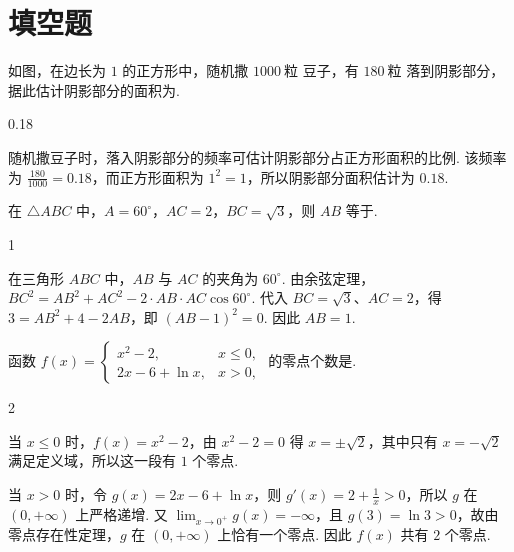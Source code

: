 \section{填空题}

\begin{problem}
如图，在边长为 \(1\) 的正方形中，随机撒 \(1000\ \text{粒}\) 豆子，有 \(180\ \text{粒}\) 落到阴影部分，据此估计阴影部分的面积为\fillinblank{}.


\begin{answer}
0.18
\end{answer}

\begin{solution}
随机撒豆子时，落入阴影部分的频率可估计阴影部分占正方形面积的比例. 该频率为 \(\frac{180}{1000}=0.18\)，而正方形面积为 \(1^2=1\)，所以阴影部分面积估计为 \(0.18\).
\end{solution}
\end{problem}

\begin{problem}
在 \(\triangle ABC\) 中，\(A = 60^\circ\)，\(AC = 2\)，\(BC = \sqrt{3}\)，则 \(AB\) 等于\fillinblank{}.

\begin{answer}
1
\end{answer}

\begin{solution}
在三角形 \(ABC\) 中，\(AB\) 与 \(AC\) 的夹角为 \(60^\circ\). 由余弦定理，\(BC^2=AB^2+AC^2-2\cdot AB\cdot AC\cos60^\circ\). 代入 \(BC=\sqrt3\)、\(AC=2\)，得 \(3=AB^2+4-2AB\)，即 \((AB-1)^2=0\). 因此 \(AB=1\).
\end{solution}
\end{problem}

\begin{problem}
函数 \(f(x) = \begin{cases}
x^2 - 2, & x \leqslant 0,\\
2x - 6 + \ln x, & x > 0,
\end{cases}\) 的零点个数是\fillinblank{}.

\begin{answer}
2
\end{answer}

\begin{solution}
当 \(x\leqslant0\) 时，\(f(x)=x^2-2\)，由 \(x^2-2=0\) 得 \(x=\pm\sqrt2\)，其中只有 \(x=-\sqrt2\) 满足定义域，所以这一段有 \(1\) 个零点.

当 \(x>0\) 时，令 \(g(x)=2x-6+\ln x\)，则 \(g'(x)=2+\frac1x>0\)，所以 \(g\) 在 \((0,+\infty)\) 上严格递增. 又 \(\displaystyle\lim_{x\to0^+}g(x)=-\infty\)，且 \(g(3)=\ln3>0\)，故由零点存在性定理，\(g\) 在 \((0,+\infty)\) 上恰有一个零点. 因此 \(f(x)\) 共有 \(2\) 个零点.
\end{solution}
\end{problem}

